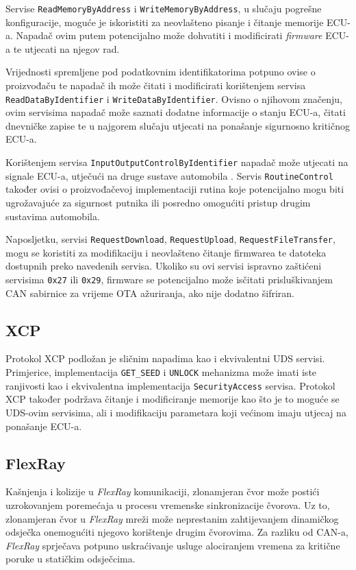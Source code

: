 \documentclass[times, utf8, diplomski, numeric]{fer}
\begin{document}
Servise \texttt{ReadMemoryByAddress} i \texttt{WriteMemoryByAddress}, u slučaju pogrešne konfiguracije, moguće je iskoristiti za neovlašteno pisanje i čitanje memorije ECU-a. Napadač ovim putem potencijalno može dohvatiti i modificirati \textit{firmware} ECU-a te utjecati na njegov rad. 

Vrijednosti spremljene pod podatkovnim identifikatorima potpuno ovise o proizvođaču te napadač ih može čitati i modificirati korištenjem servisa \texttt{ReadDataByIdentifier} i \texttt{WriteDataByIdentifier}. Ovisno o njihovom značenju, ovim servisima napadač može saznati dodatne informacije o stanju ECU-a, čitati dnevničke zapise te u najgorem slučaju utjecati na ponašanje sigurnosno kritičnog ECU-a.

Korištenjem servisa \texttt{InputOutputControlByIdentifier} napadač može utjecati na signale ECU-a, utječući na druge sustave automobila \cite{dissecto2023uds}. Servis \texttt{RoutineControl} također ovisi o proizvođačevoj implementaciji rutina koje potencijalno mogu biti ugrožavajuće za sigurnost putnika ili posredno omogućiti pristup drugim sustavima automobila.

Naposljetku, servisi \texttt{RequestDownload}, \texttt{RequestUpload}, \texttt{RequestFileTransfer}, mogu se koristiti za modifikaciju i neovlašteno čitanje firmwarea te datoteka dostupnih preko navedenih servisa. Ukoliko su ovi servisi ispravno zaštićeni servisima \texttt{0x27} ili \texttt{0x29}, firmware se potencijalno može isčitati prisluškivanjem CAN sabirnice za vrijeme OTA ažuriranja, ako nije dodatno šifriran.

\subsection{XCP}
Protokol XCP podložan je sličnim napadima kao i ekvivalentni UDS servisi. Primjerice, implementacija \texttt{GET\_SEED} i \texttt{UNLOCK} mehanizma može imati iste ranjivosti kao i ekvivalentna implementacija \texttt{SecurityAccess} servisa. Protokol XCP također podržava čitanje i modificiranje memorije kao što je to moguće se UDS-ovim servisima, ali i modifikaciju parametara koji većinom imaju utjecaj na ponašanje ECU-a.  

\subsection{FlexRay}
Kašnjenja i kolizije u \textit{FlexRay} komunikaciji, zlonamjeran čvor može postići uzrokovanjem poremećaja u procesu vremenske sinkronizacije čvorova. Uz to, zlonamjeran čvor u \textit{FlexRay} mreži može neprestanim zahtijevanjem dinamičkog odsječka onemogućiti njegovo korištenje drugim čvorovima. Za razliku od CAN-a, \textit{FlexRay} sprječava potpuno uskraćivanje usluge alociranjem vremena za kritične poruke u statičkim odsječcima.
\end{document}

